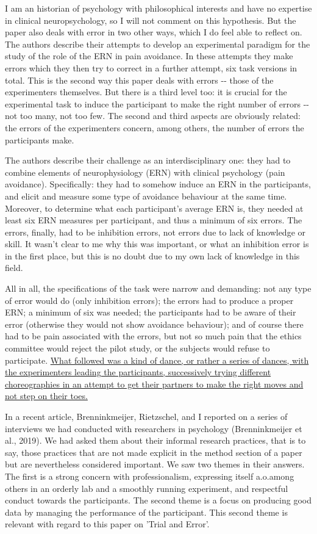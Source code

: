 \documentclass[twocolumn, serif, authordate, review]{jote-article}
\begin{document}
I am an historian of psychology with philosophical interests and have no expertise in clinical neuropsychology, so I will not comment on this hypothesis. But the paper also deals with error in two other ways, which I do feel able to reflect on. The authors describe their attempts to develop an experimental paradigm for the study of the role of the ERN in pain avoidance. In these attempts they make errors which they then try to correct in a further attempt, six task versions in total. This is the second way this paper deals with errors -{}- those of the experimenters themselves. But there is a third level too: it is crucial for the experimental task to induce the participant to make the right number of errors -{}- not too many, not too few. The second and third aspects are obviously related: the errors of the experimenters concern, among others, the number of errors the participants make.

The authors describe their challenge as an interdisciplinary one: they had to combine elements of neurophysiology (ERN) with clinical psychology (pain avoidance). Specifically: they had to somehow induce an ERN in the participants, and elicit and measure some type of avoidance behaviour at the same time. Moreover, to determine what each participant's average ERN is, they needed at least six ERN measures per participant, and thus a minimum of six errors. The errors, finally, had to be {\textquotedbl}inhibition errors{\textquotedbl}, not errors due to lack of knowledge or skill. It wasn't clear to me why this was important, or what an inhibition error is in the first place, but this is no doubt due to my own lack of knowledge in this field.

All in all, the specifications of the task were narrow and demanding: not any type of error would do (only inhibition errors); the errors had to produce a proper ERN; a minimum of six was needed; the participants had to be aware of their error (otherwise they would not show avoidance behaviour); and of course there had to be pain associated with the errors, but not so much pain that the ethics committee would reject the pilot study, or the subjects would refuse to participate. \hyperref[sec:reviews]{What followed was a kind of dance, or rather a series of dances, with the experimenters leading the participants, successively trying different choreographies in an attempt to get their partners to make the right moves and not step on their toes.} \label{sec:constructed}

In a recent article, Brenninkmeijer, Rietzschel, and I reported on a series of interviews we had conducted with researchers in psychology (Brenninkmeijer et al., 2019). We had asked them about their informal research practices, that is to say, those practices that are not made explicit in the method section of a paper but are nevertheless considered important. We saw two themes in their answers. The first is a strong concern with professionalism, expressing itself a.o.among others in an orderly lab and a smoothly running experiment, and respectful conduct towards the participants. The second theme is a focus on producing good data by managing the performance of the participant. This second theme is relevant with regard to this paper on 'Trial and Error'.
\end{document}
